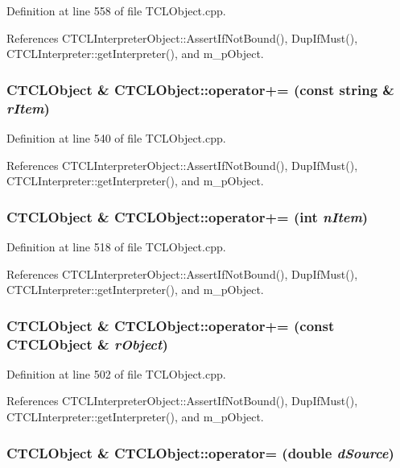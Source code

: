 Definition at line 558 of file TCLObject.cpp.

References CTCLInterpreter\-Object::Assert\-If\-Not\-Bound(), Dup\-If\-Must(), CTCLInterpreter::get\-Interpreter(), and m\_\-p\-Object.
\subsubsection{\setlength{\rightskip}{0pt plus 5cm}CTCLObject \& CTCLObject::operator+= (const string \& {\em r\-Item})}\label{classCTCLObject_a18}




Definition at line 540 of file TCLObject.cpp.

References CTCLInterpreter\-Object::Assert\-If\-Not\-Bound(), Dup\-If\-Must(), CTCLInterpreter::get\-Interpreter(), and m\_\-p\-Object.
\subsubsection{\setlength{\rightskip}{0pt plus 5cm}CTCLObject \& CTCLObject::operator+= (int {\em n\-Item})}\label{classCTCLObject_a17}




Definition at line 518 of file TCLObject.cpp.

References CTCLInterpreter\-Object::Assert\-If\-Not\-Bound(), Dup\-If\-Must(), CTCLInterpreter::get\-Interpreter(), and m\_\-p\-Object.
\subsubsection{\setlength{\rightskip}{0pt plus 5cm}CTCLObject \& CTCLObject::operator+= (const CTCLObject \& {\em r\-Object})}\label{classCTCLObject_a16}




Definition at line 502 of file TCLObject.cpp.

References CTCLInterpreter\-Object::Assert\-If\-Not\-Bound(), Dup\-If\-Must(), CTCLInterpreter::get\-Interpreter(), and m\_\-p\-Object.
\subsubsection{\setlength{\rightskip}{0pt plus 5cm}CTCLObject \& CTCLObject::operator= (double {\em d\-Source})}\label{classCTCLObject_a11}




